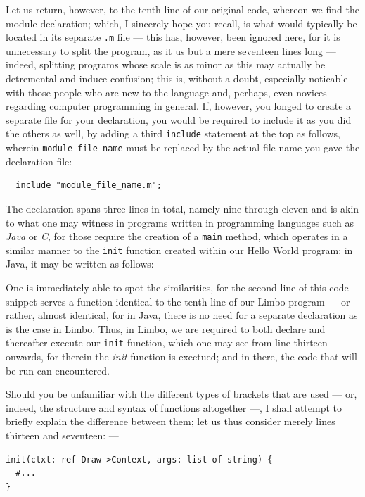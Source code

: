 \documentclass[a5paper,twoside,12pt]{report}
\begin{document}
Let us return, however, to the tenth line of our original code, whereon we find the module declaration; which, I sincerely hope you recall, is what would typically be located in its separate \texttt{.m} file — this has, however, been ignored here, for it is unnecessary to split the program, as it us but a mere seventeen lines long — indeed, splitting programs whose scale is as minor as this may actually be detremental and induce confusion; this is, without a doubt, especially noticable with those people who are new to the language and, perhaps, even novices regarding computer programming in general. If, however, you longed to create a separate file for your declaration, you would be required to include it as you did the others as well, by adding a third \texttt{include} statement at the top as follows, wherein \texttt{module\_file\_name} must be replaced by the actual file name you gave the declaration file: —

\begin{lstlisting}
  include "module_file_name.m";
\end{lstlisting}

The declaration spans three lines in total, namely nine through eleven and is akin to what one may witness in programs written in programming languages such as \textit{Java} or \textit{C}, for those require the creation of a \texttt{main} method, which operates in a similar manner to the \texttt{init} function created within our Hello World program; in Java, it may be written as follows: —



One is immediately able to spot the similarities, for the second line of this code snippet serves a function identical to the tenth line of our Limbo program — or rather, almost identical, for in Java, there is no need for a separate declaration as is the case in Limbo. Thus, in Limbo, we are required to both declare and thereafter execute our \texttt{init} function, which one may see from line thirteen onwards, for therein the \textit{init} function is exectued; and in there, the code that will be run can encountered.

Should you be unfamiliar with the different types of brackets that are used — or, indeed, the structure and syntax of functions altogether —, I shall attempt to briefly explain the difference between them; let us thus consider merely lines thirteen and seventeen: —

\begin{lstlisting}
init(ctxt: ref Draw->Context, args: list of string) {
  #...
}
\end{lstlisting}
\end{document}
